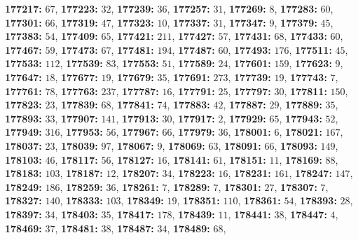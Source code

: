 \textsf{\bfseries 177217:} $67$, \textsf{\bfseries 177223:} $32$, \textsf{\bfseries 177239:} $36$, \textsf{\bfseries 177257:} $31$, \textsf{\bfseries 177269:} $8$, \textsf{\bfseries 177283:} $60$, \textsf{\bfseries 177301:} $66$, \textsf{\bfseries 177319:} $47$, \textsf{\bfseries 177323:} $10$, \textsf{\bfseries 177337:} $31$, \textsf{\bfseries 177347:} $9$, \textsf{\bfseries 177379:} $45$, \textsf{\bfseries 177383:} $54$, \textsf{\bfseries 177409:} $65$, \textsf{\bfseries 177421:} $211$, \textsf{\bfseries 177427:} $57$, \textsf{\bfseries 177431:} $68$, \textsf{\bfseries 177433:} $60$, \textsf{\bfseries 177467:} $59$, \textsf{\bfseries 177473:} $67$, \textsf{\bfseries 177481:} $194$, \textsf{\bfseries 177487:} $60$, \textsf{\bfseries 177493:} $176$, \textsf{\bfseries 177511:} $45$, \textsf{\bfseries 177533:} $112$, \textsf{\bfseries 177539:} $83$, \textsf{\bfseries 177553:} $51$, \textsf{\bfseries 177589:} $24$, \textsf{\bfseries 177601:} $159$, \textsf{\bfseries 177623:} $9$, \textsf{\bfseries 177647:} $18$, \textsf{\bfseries 177677:} $19$, \textsf{\bfseries 177679:} $35$, \textsf{\bfseries 177691:} $273$, \textsf{\bfseries 177739:} $19$, \textsf{\bfseries 177743:} $7$, \textsf{\bfseries 177761:} $78$, \textsf{\bfseries 177763:} $237$, \textsf{\bfseries 177787:} $16$, \textsf{\bfseries 177791:} $25$, \textsf{\bfseries 177797:} $30$, \textsf{\bfseries 177811:} $150$, \textsf{\bfseries 177823:} $23$, \textsf{\bfseries 177839:} $68$, \textsf{\bfseries 177841:} $74$, \textsf{\bfseries 177883:} $42$, \textsf{\bfseries 177887:} $29$, \textsf{\bfseries 177889:} $35$, \textsf{\bfseries 177893:} $33$, \textsf{\bfseries 177907:} $141$, \textsf{\bfseries 177913:} $30$, \textsf{\bfseries 177917:} $2$, \textsf{\bfseries 177929:} $65$, \textsf{\bfseries 177943:} $52$, \textsf{\bfseries 177949:} $316$, \textsf{\bfseries 177953:} $56$, \textsf{\bfseries 177967:} $66$, \textsf{\bfseries 177979:} $36$, \textsf{\bfseries 178001:} $6$, \textsf{\bfseries 178021:} $167$, \textsf{\bfseries 178037:} $23$, \textsf{\bfseries 178039:} $97$, \textsf{\bfseries 178067:} $9$, \textsf{\bfseries 178069:} $63$, \textsf{\bfseries 178091:} $66$, \textsf{\bfseries 178093:} $149$, \textsf{\bfseries 178103:} $46$, \textsf{\bfseries 178117:} $56$, \textsf{\bfseries 178127:} $16$, \textsf{\bfseries 178141:} $61$, \textsf{\bfseries 178151:} $11$, \textsf{\bfseries 178169:} $88$, \textsf{\bfseries 178183:} $103$, \textsf{\bfseries 178187:} $12$, \textsf{\bfseries 178207:} $34$, \textsf{\bfseries 178223:} $16$, \textsf{\bfseries 178231:} $161$, \textsf{\bfseries 178247:} $147$, \textsf{\bfseries 178249:} $186$, \textsf{\bfseries 178259:} $36$, \textsf{\bfseries 178261:} $7$, \textsf{\bfseries 178289:} $7$, \textsf{\bfseries 178301:} $27$, \textsf{\bfseries 178307:} $7$, \textsf{\bfseries 178327:} $140$, \textsf{\bfseries 178333:} $103$, \textsf{\bfseries 178349:} $19$, \textsf{\bfseries 178351:} $110$, \textsf{\bfseries 178361:} $54$, \textsf{\bfseries 178393:} $28$, \textsf{\bfseries 178397:} $34$, \textsf{\bfseries 178403:} $35$, \textsf{\bfseries 178417:} $178$, \textsf{\bfseries 178439:} $11$, \textsf{\bfseries 178441:} $38$, \textsf{\bfseries 178447:} $4$, \textsf{\bfseries 178469:} $37$, \textsf{\bfseries 178481:} $38$, \textsf{\bfseries 178487:} $34$, \textsf{\bfseries 178489:} $68$, 
